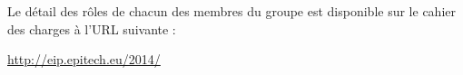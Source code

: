 \documentclass{life-fr}
\begin{document}
Le détail des rôles de chacun des membres du groupe est disponible sur
le cahier des charges à l'URL suivante :\\
\begin{center}
  \url{http://eip.epitech.eu/2014/}
\end{center}

\end{document}
